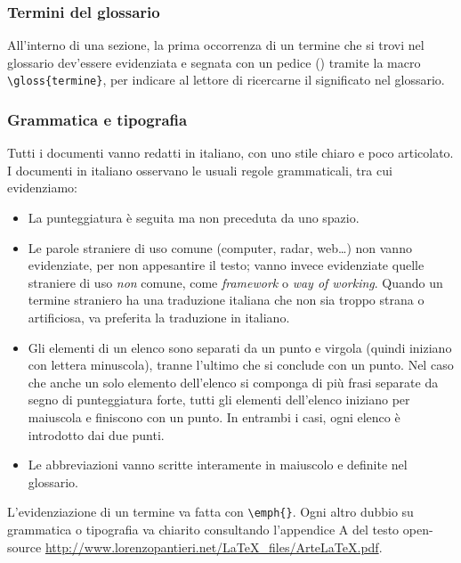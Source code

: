\subsubsection{Termini del glossario} All'interno di una sezione, la prima occorrenza di un termine che si trovi nel glossario dev'essere evidenziata e segnata con un pedice () tramite la macro \texttt{\textbackslash gloss\{termine\}}, per indicare al lettore di ricercarne il significato nel glossario.

\subsubsection{Grammatica e tipografia} Tutti i documenti vanno redatti in italiano, con uno stile chiaro e poco articolato. I documenti in italiano osservano le usuali regole grammaticali, tra cui evidenziamo:
\begin{itemize}
	\item La punteggiatura è seguita ma non preceduta da uno spazio.
	\item Le parole straniere di uso comune (computer, radar, web\dots) non vanno evidenziate, per non appesantire il testo; vanno invece evidenziate quelle straniere di uso \emph{non} comune, come \emph{framework} o \emph{way of working}. Quando un termine straniero ha una traduzione italiana che non sia troppo strana o artificiosa, va preferita la traduzione in italiano.
	\item Gli elementi di un elenco sono separati da un punto e virgola (quindi iniziano con lettera minuscola), tranne l'ultimo che si conclude con un punto. Nel caso che anche un solo elemento dell'elenco si componga di più frasi separate da segno di punteggiatura forte, tutti gli elementi dell'elenco iniziano per maiuscola e finiscono con un punto. In entrambi i casi, ogni elenco è introdotto dai due punti.
	\item Le abbreviazioni vanno scritte interamente in maiuscolo e definite nel glossario.
\end{itemize}
L'evidenziazione di un termine va fatta con \texttt{\textbackslash emph\{\}}. Ogni altro dubbio su grammatica o tipografia va chiarito consultando l'appendice A del testo open-source \url{http://www.lorenzopantieri.net/LaTeX_files/ArteLaTeX.pdf}.

